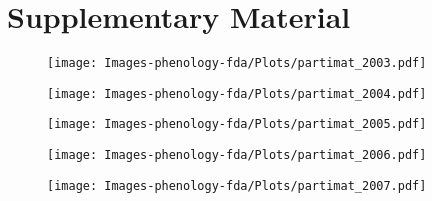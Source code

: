\section{Supplementary Material} %
\label{sec:supplementary_material}

\begin{figure}
	[htbp] \centering 
	\texttt{[image: Images-phenology-fda/Plots/partimat\_2003.pdf]} \caption{} 
	\label{partimat 2003} 
\end{figure}
\begin{figure}
	[htbp] \centering 
	\texttt{[image: Images-phenology-fda/Plots/partimat\_2004.pdf]} \caption{} 
	\label{partimat 2004} 
\end{figure}
\begin{figure}
	[htbp] \centering 
	\texttt{[image: Images-phenology-fda/Plots/partimat\_2005.pdf]} \caption{} 
	\label{partimat 2005} 
\end{figure}
\begin{figure}
	[htbp] \centering 
	\texttt{[image: Images-phenology-fda/Plots/partimat\_2006.pdf]} \caption{} 
	\label{partimat 2006} 
\end{figure}
\begin{figure}
	[htbp] \centering 
	\texttt{[image: Images-phenology-fda/Plots/partimat\_2007.pdf]} \caption{} 
	\label{partimat 2007} 
\end{figure}




